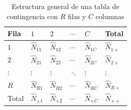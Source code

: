 \documentclass[
  spanish,
  11pt,
  letterpaper,
  oneside,
  open=any]{scrbook}
\begin{document}
{

\begin{longtable}[]{@{}
  >{\centering\arraybackslash}p{}
  >{\centering\arraybackslash}p{}
  >{\centering\arraybackslash}p{}
  >{\centering\arraybackslash}p{}
  >{\centering\arraybackslash}p{}
  >{\centering\arraybackslash}p{}@{}}

\caption{\label{tbl-estructura-contingencia}Estructura general de una
tabla de contingencia con \(R\) filas y \(C\) columnas}

\tabularnewline

\toprule\noalign{}
\begin{minipage}[b]{\linewidth}\centering
Fila
\end{minipage} & \begin{minipage}[b]{\linewidth}\centering
\(1\)
\end{minipage} & \begin{minipage}[b]{\linewidth}\centering
\(2\)
\end{minipage} & \begin{minipage}[b]{\linewidth}\centering
\(\cdots\)
\end{minipage} & \begin{minipage}[b]{\linewidth}\centering
\(C\)
\end{minipage} & \begin{minipage}[b]{\linewidth}\centering
Total
\end{minipage} \\
\midrule\noalign{}
\endhead
\bottomrule\noalign{}
\endlastfoot
\(1\) & \(\widehat{N}_{11}\) & \(\widehat{N}_{12}\) & \(\cdots\) &
\(\widehat{N}_{1C}\) & \(\widehat{N}_{1+}\) \\
\(2\) & \(\widehat{N}_{21}\) & \(\widehat{N}_{22}\) & \(\cdots\) &
\(\widehat{N}_{2C}\) & \(\widehat{N}_{2+}\) \\
\(\vdots\) & \(\vdots\) & \(\vdots\) & \(\ddots\) & \(\vdots\) &
\(\vdots\) \\
\(R\) & \(\widehat{N}_{R1}\) & \(\widehat{N}_{R2}\) & \(\cdots\) &
\(\widehat{N}_{RC}\) & \(\widehat{N}_{R+}\) \\
Total & \(\widehat{N}_{+1}\) & \(\widehat{N}_{+2}\) & \(\cdots\) &
\(\widehat{N}_{+C}\) & \(\widehat{N}_{++}\) \\

\end{longtable}

}
\end{document}

